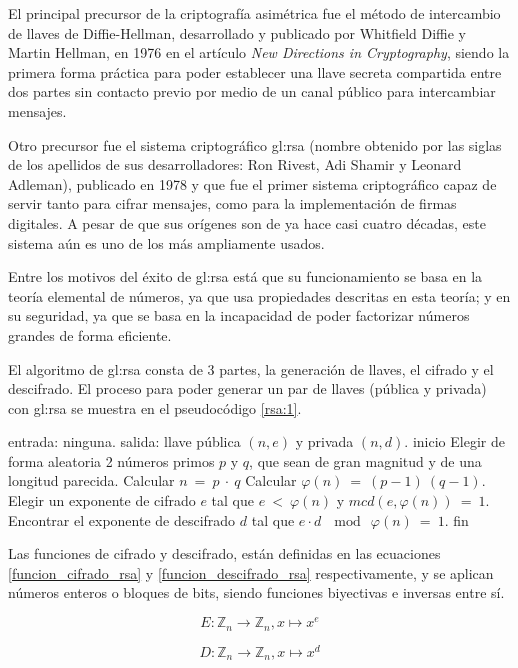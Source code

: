   El principal precursor de la criptografía asimétrica fue el método de
  intercambio de llaves de Diffie-Hellman, desarrollado y publicado por
  Whitfield Diffie y Martin Hellman, en 1976 en el artículo \textit{New
  Directions in Cryptography}\cite{diffie_hellman}, siendo la primera
  forma práctica para poder establecer una llave secreta compartida
  entre dos partes sin contacto previo por medio de un canal público
  para intercambiar mensajes.

  Otro precursor fue el sistema criptográfico \gls{gl:rsa} (nombre
  obtenido por las siglas de los apellidos de sus desarrolladores: Ron Rivest,
  Adi Shamir y Leonard Adleman), publicado en 1978\cite{rsa_publicacion} y que
  fue el primer sistema criptográfico capaz de servir tanto para cifrar
  mensajes, como para la implementación de firmas digitales. A pesar de que sus
  orígenes son de ya hace casi cuatro décadas, este sistema aún es uno de los
  más ampliamente usados.

  Entre los motivos del éxito de \gls{gl:rsa} está que su funcionamiento
  se basa en la teoría elemental de números, ya que usa propiedades descritas
  en esta teoría; y en su seguridad, ya que se basa en la incapacidad de poder
  factorizar números grandes de forma eficiente.

  El algoritmo de \gls{gl:rsa} consta de 3 partes, la generación de llaves,
  el cifrado y el descifrado. El proceso para poder generar un par de llaves
  (pública y privada) con \gls{gl:rsa} se muestra en el pseudocódigo
  \ref{rsa:1}.

  \begin{pseudocodigo}[caption={Proceso de generación de llaves de
    \gls{gl:rsa}.}, label={rsa:1}]
    entrada: ninguna.
    salida:  llave pública $(n,e)$ y privada $(n,d)$.
    inicio
      Elegir de forma aleatoria 2 números primos $p$ y $q$, que sean de gran
      magnitud y de una longitud parecida.
      Calcular $n\: =\: p \:\cdot \:q$
      Calcular $\varphi(n) \:= \:(p-1) \:(q-1)$.
      Elegir un exponente de cifrado $e$ tal que $e \:< \:\varphi(n)$ y $mcd(e,\varphi(n)) \:= \:1$.
      Encontrar el exponente de descifrado $d$ tal que $e \cdot d \:\mod \:\varphi(n) \:= \:1$.
    fin
  \end{pseudocodigo}

  Las funciones de cifrado y descifrado, están definidas en las ecuaciones
  \ref{funcion_cifrado_rsa} y \ref{funcion_descifrado_rsa} respectivamente,
  y se aplican números enteros o bloques de bits, siendo funciones biyectivas
  e inversas entre sí.

  \begin{equation}
    \label{funcion_cifrado_rsa}
    E: \mathbb{Z}_n \longrightarrow \mathbb{Z}_n, x \longmapsto x^e
  \end{equation}

  \begin{equation}
    \label{funcion_descifrado_rsa}
    D: \mathbb{Z}_n \longrightarrow \mathbb{Z}_n, x \longmapsto x^d
  \end{equation}
